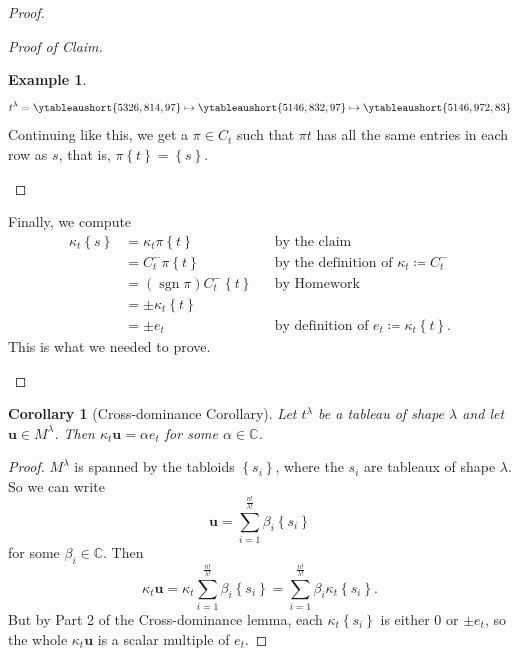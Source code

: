 \documentclass[12pt]{article}
\newcommand{\cx}{\mathbb{C}}
\newcommand\paren[1]{\left( #1 \right)}
\newcommand\setb[1]{\left \{ #1 \right \}}
\newtheorem{corollary}[theorem]{Corollary}
\theoremstyle{definition}
\newtheorem{example}{Example}[section]
\DeclareMathOperator\sgn{sgn}
\begin{document}
\begin{proof}
\begin{enumerate}
\begin{proof}[Proof of Claim]
\begin{example}
                \begin{equation*}
                    t^{\lambda} = \ytableaushort{5326,814,97} \mapsto 
                    \ytableaushort{5146,832,97}
                    \mapsto 
                    \ytableaushort{5146,972,83}
                \end{equation*}
                Continuing like this, we get a $\pi \in C_t$ such that $\pi t$ has all the same entries in each row as $s$, that is, $\pi \setb{ t } = \setb{ s }$. \, \checkmark
            \end{example}
        \end{proof}
        Finally, we compute 
        \begin{align*}
            \kappa_t \setb{ s } & = \kappa_t \pi \setb{ t } && \text{by the claim} \\
            & = C_t^- \pi \setb{ t } && \text{by the definition of } \kappa_t \coloneqq  C_t^- \\
            & = \paren{ \sgn \pi } C_t^- \setb{t } && \text{by Homework} \\
            & = \pm \kappa_t \setb{ t } \\
            & = \pm e_t && \text{by definition of } e_t \coloneqq  \kappa_t \setb{ t }.
        \end{align*}
        This is what we needed to prove.
    \end{enumerate}
\end{proof}
\begin{corollary}[Cross-dominance Corollary]
    Let $t^{\lambda}$ be a tableau of shape $\lambda$ and let $\mathbf{u} \in M^{\lambda}$. Then $\kappa_t \mathbf{u} = \alpha e_t$ for some $\alpha \in \cx$.
\end{corollary}
\begin{proof}
    $M^{\lambda}$ is spanned by the tabloids $\setb{ s_i }$, where the $s_i$ are tableaux of shape $\lambda$. So we can write
    \begin{equation*}
        \mathbf{u} = \sum\limits_{i = 1}^{\frac{n!}{\lambda!}} \beta_i \setb{ s_i }
    \end{equation*}
    for some $\beta_i \in \cx$. Then 
    \begin{equation*}
        \kappa_t \mathbf{u} = \kappa_t \sum\limits_{i = 1}^{\frac{n!}{\lambda!}} \beta_i \setb{ s_i } = \sum\limits_{i = 1}^{\frac{n!}{\lambda!}} \beta_i \kappa_t \setb{ s_i }.
    \end{equation*}
    But by Part 2 of the Cross-dominance lemma, each $\kappa_t \setb{ s_i }$ is either $0$ or $\pm e_t$, so the whole $\kappa_t \mathbf{u}$ is a scalar multiple of $e_t$.
\end{proof}
\end{document}
